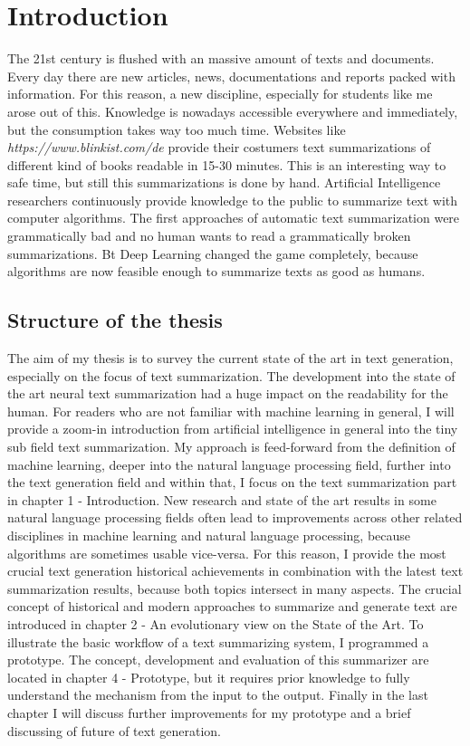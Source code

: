 \chapter{Introduction}\label{ch:intro}

The 21st century is flushed with an massive amount of texts and documents. Every day there are new articles, news, documentations and reports packed with information. For this reason, a new discipline, especially for students like me arose out of this. Knowledge is nowadays accessible everywhere and immediately, but the consumption takes way too much time. Websites like \textit{https://www.blinkist.com/de} provide their costumers text summarizations of different kind of books readable in 15-30 minutes. This is an interesting way to safe time, but still this summarizations is done by hand. Artificial Intelligence researchers continuously provide knowledge to the public to summarize text with computer algorithms. The first approaches of automatic text summarization were grammatically bad and no human wants to read a grammatically broken summarizations. Bt Deep Learning changed the game completely, because algorithms are now feasible enough to summarize texts as good as humans. 

\section{Structure of the thesis}
The aim of my thesis is to survey the current state of the art in text generation, especially on the focus of text summarization. The development into the state of the art neural text summarization had a huge impact on the readability for the human. For readers who are not familiar with machine learning in general, I will provide a zoom-in introduction from artificial intelligence in general into the tiny sub field text summarization. My approach is feed-forward from the definition of machine learning, deeper into the natural language processing field, further into the text generation field and within that, I focus on the text summarization part in chapter 1 - Introduction. New research and state of the art results in some natural language processing fields often lead to improvements across other related disciplines in machine learning and natural language processing, because algorithms are sometimes usable vice-versa. For this reason, I provide the most crucial text generation historical achievements in combination with the latest text summarization results, because both topics intersect in many aspects. The crucial concept of historical and modern approaches to summarize and generate text are introduced in chapter 2 - An evolutionary view on the State of the Art. 
To illustrate the basic workflow of a text summarizing system, I programmed a prototype. The concept, development and evaluation of this summarizer are located in chapter 4 - Prototype, but it requires prior knowledge to fully understand the mechanism from the input to the output. Finally in the last chapter I will discuss further improvements for my prototype and a brief discussing of future of text generation.

